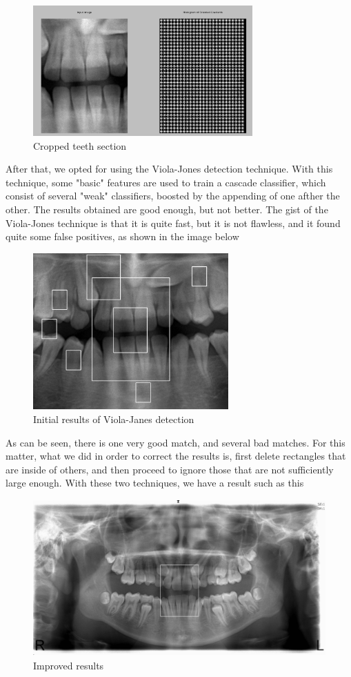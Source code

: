 \begin{figure}[h]
  \centering
  \includegraphics[height=5cm]{img/teeth_hog}
  \caption{Cropped teeth section}
\end{figure}

After that, we opted for using the Viola-Jones detection technique. With this
technique, some "basic" features are used to train a cascade classifier, which
consist of several "weak" classifiers, boosted by the appending of one afther
the other. The results obtained are good enough, but not better. The gist of
the Viola-Jones technique is that it is quite fast, but it is not flawless, and
it found quite some false positives, as shown in the image below

\begin{figure}[h]
  \centering
  \includegraphics[height=6cm]{img/teeth_detection_1}
  \caption{Initial results of Viola-Janes detection}
\end{figure}

As can be seen, there is one very good match, and several bad matches. For this
matter, what we did in order to correct the results is, first delete rectangles
that are inside of others, and then proceed to ignore those that are not
sufficiently large enough. With these two techniques, we have a result such as
this

\begin{figure}[h]
  \centering
  \includegraphics[height=6cm]{img/teeth_detection_2}
  \caption{Improved results}
\end{figure}


